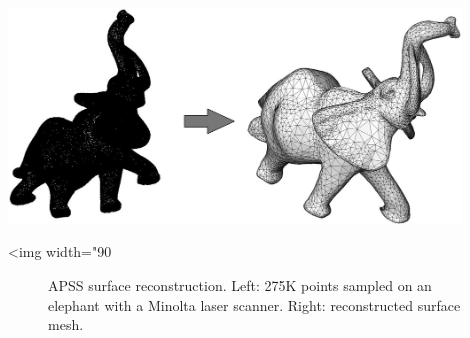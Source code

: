 \begin{center}
    \label{Surface_reconstruction_points_3-fig-introduction}
    \begin{ccTexOnly}
        \includegraphics[width=0.9\textwidth]{Surface_reconstruction_points_3/introduction} %
    \end{ccTexOnly}
    \begin{ccHtmlOnly}
        <img width="90%
    \end{ccHtmlOnly}
    \begin{figure}[h]
        \caption{APSS surface reconstruction.
                 Left: 275K points sampled on an elephant with a Minolta laser scanner.
                 Right: reconstructed surface mesh.}
    \end{figure}
\end{center}


